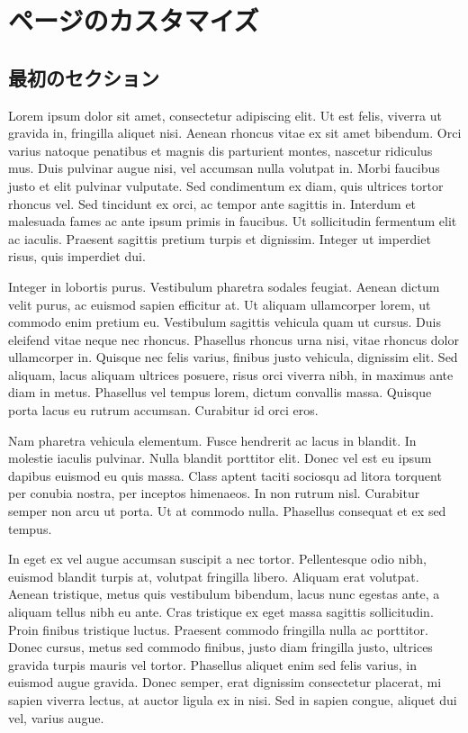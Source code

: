 \chapter{ページのカスタマイズ}
\section{最初のセクション}
Lorem ipsum dolor sit amet, consectetur adipiscing elit. Ut est felis, viverra ut gravida in, fringilla aliquet nisi. Aenean rhoncus vitae ex sit amet bibendum. Orci varius natoque penatibus et magnis dis parturient montes, nascetur ridiculus mus. Duis pulvinar augue nisi, vel accumsan nulla volutpat in. Morbi faucibus justo et elit pulvinar vulputate. Sed condimentum ex diam, quis ultrices tortor rhoncus vel. Sed tincidunt ex orci, ac tempor ante sagittis in. Interdum et malesuada fames ac ante ipsum primis in faucibus. Ut sollicitudin fermentum elit ac iaculis. Praesent sagittis pretium turpis et dignissim. Integer ut imperdiet risus, quis imperdiet dui.

Integer in lobortis purus. Vestibulum pharetra sodales feugiat. Aenean dictum velit purus, ac euismod sapien efficitur at. Ut aliquam ullamcorper lorem, ut commodo enim pretium eu. Vestibulum sagittis vehicula quam ut cursus. Duis eleifend vitae neque nec rhoncus. Phasellus rhoncus urna nisi, vitae rhoncus dolor ullamcorper in. Quisque nec felis varius, finibus justo vehicula, dignissim elit. Sed aliquam, lacus aliquam ultrices posuere, risus orci viverra nibh, in maximus ante diam in metus. Phasellus vel tempus lorem, dictum convallis massa. Quisque porta lacus eu rutrum accumsan. Curabitur id orci eros.

Nam pharetra vehicula elementum. Fusce hendrerit ac lacus in blandit. In molestie iaculis pulvinar. Nulla blandit porttitor elit. Donec vel est eu ipsum dapibus euismod eu quis massa. Class aptent taciti sociosqu ad litora torquent per conubia nostra, per inceptos himenaeos. In non rutrum nisl. Curabitur semper non arcu ut porta. Ut at commodo nulla. Phasellus consequat et ex sed tempus.

In eget ex vel augue accumsan suscipit a nec tortor. Pellentesque odio nibh, euismod blandit turpis at, volutpat fringilla libero. Aliquam erat volutpat. Aenean tristique, metus quis vestibulum bibendum, lacus nunc egestas ante, a aliquam tellus nibh eu ante. Cras tristique ex eget massa sagittis sollicitudin. Proin finibus tristique luctus. Praesent commodo fringilla nulla ac porttitor. Donec cursus, metus sed commodo finibus, justo diam fringilla justo, ultrices gravida turpis mauris vel tortor. Phasellus aliquet enim sed felis varius, in euismod augue gravida. Donec semper, erat dignissim consectetur placerat, mi sapien viverra lectus, at auctor ligula ex in nisi. Sed in sapien congue, aliquet dui vel, varius augue.

